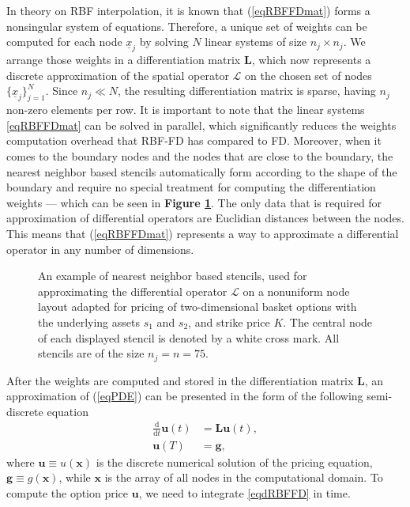 \documentclass{UUThesisTemplate}
\begin{document}
In theory on RBF interpolation, it is known that (\ref{eqRBFFDmat}) forms a nonsingular system of equations. Therefore, a unique set of weights can be computed for each node $\underline{x}_j$ by solving $N$ linear systems of size $n_j\times n_j$. We arrange those weights in a differentiation matrix $\mathbf{L}$, which now represents a discrete approximation of the spatial operator $\mathcal{L}$ on the chosen set of nodes $\{\underline{x}_j\}_{j=1}^N$. Since $n_j \ll N$, the resulting differentiation matrix is sparse, having $n_j$ non-zero elements per row. It is important to note that the linear systems \eqref{eqRBFFDmat} can be solved in parallel, which significantly reduces the weights computation overhead that RBF-FD has compared to FD. Moreover, when it comes to the boundary nodes and the nodes that are close to the boundary, the nearest neighbor based stencils automatically form according to the shape of the boundary and require no special treatment for computing the differentiation weights --- which can be seen in \textbf{Figure \ref{fig:gridsten}}. The only data that is required for approximation of differential operators are Euclidian distances between the nodes. This means that (\ref{eqRBFFDmat}) represents a way to approximate a differential operator in any number of dimensions.

\begin{figure}[H]
\centering

\caption{An example of nearest neighbor based stencils, used for approximating the differential operator $\mathcal{L}$ on a nonuniform node layout adapted for pricing of two-dimensional basket options with the underlying assets $s_1$ and $s_2$, and strike price $K$. The central node of each displayed stencil is denoted by a white cross mark. All stencils are of the size $n_j=n=75$.}
\label{fig:gridsten}
\end{figure}

\par
After the weights are computed and stored in the differentiation matrix $\mathbf{L}$, an approximation of (\ref{eqPDE}) can be presented in the form of the following semi-discrete equation
\begin{align}
\label{eqdRBFFD}
\frac{\mathrm{d}}{\mathrm{d} t}\mathbf{u}(t)&=\mathbf{L}\mathbf{u}(t),\\
\mathbf{u}(T)&=\mathbf{g},
\end{align}
where $\mathbf{u}\equiv u(\mathbf{x})$ is the discrete numerical solution of the pricing equation, $\mathbf{g}\equiv g(\mathbf{x})$, while $\mathbf{x}$ is the array of all nodes in the computational domain. To compute the option price $\mathbf{u}$, we need to integrate \eqref{eqdRBFFD} in time. 
\end{document}
